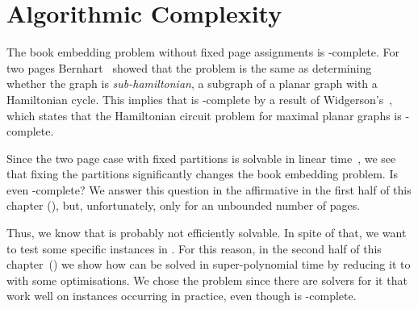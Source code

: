 \chapter{Algorithmic Complexity}
\label{chapter:complexity}

The book embedding problem  without fixed page assignments  \probBookNormal is \NP-complete. For two pages
Bernhart~\cite{Bernhart79} showed that the problem is the same
as determining whether the graph is \emph{sub-hamiltonian}, \ie a subgraph of a planar
graph with a Hamiltonian cycle. This implies that \probBookNormal is \NP-complete by a result of Widgerson's~\cite{Widgerson82},
which states that the Hamiltonian circuit problem for maximal planar graphs is \NP-complete.

Since the two page case with fixed partitions is solvable in linear time~\cite{two-page-09},
we see that fixing the partitions significantly changes the book embedding problem. Is \probBook even
\NP-complete? We answer this question in the affirmative in the first
half of this chapter (),
but, unfortunately, only for an unbounded number of pages. 

Thus, we know that \probBook is probably not efficiently solvable. In spite of that, we
want to test some specific instances in .
For this reason, in the second half of
this chapter~() we show how \probBook can be solved in super-polynomial time  by reducing it to \probThreeSat with some optimisations.
We chose the \probThreeSat problem since there are solvers for it that work well
on instances occurring in practice, even though \probThreeSat is \NP-complete.


